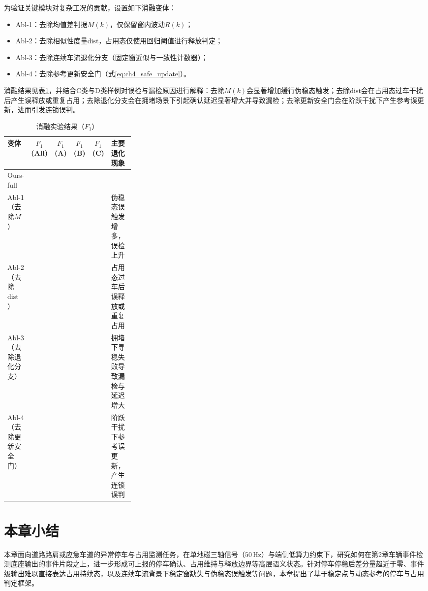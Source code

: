 \documentclass{xdupgthesis}
\begin{document}
为验证关键模块对复杂工况的贡献，设置如下消融变体：
\begin{itemize}
  \item Abl-1：去除均值差判据$M(k)$，仅保留窗内波动$R(k)$；
  \item Abl-2：去除相似性度量$\mathrm{dist}$，占用态仅使用回归阈值进行释放判定；
  \item Abl-3：去除连续车流退化分支（固定窗近似与一致性计数器）；
  \item Abl-4：去除参考更新安全门（式\eqref{eq:ch4_safe_update}）。
\end{itemize}
消融结果见表\ref{tab:ch4_ablation}，并结合C类与D类样例对误检与漏检原因进行解释：去除$M(k)$会显著增加缓行伪稳态触发；去除$\mathrm{dist}$会在占用态过车干扰后产生误释放或重复占用；去除退化分支会在拥堵场景下引起确认延迟显著增大并导致漏检；去除更新安全门会在阶跃干扰下产生参考误更新，进而引发连锁误判。

\begin{table}[t]
\centering
\caption{消融实验结果（$F_1$）}
\label{tab:ch4_ablation}
\begin{tabular}{l c c c c p{0.30\linewidth}}
\hline
变体 & $F_1$(All) & $F_1$(A) & $F_1$(B) & $F_1$(C) & 主要退化现象 \\
\hline
Ours-full &  &  &  &  &  \\
Abl-1（去除$M$） &  &  &  &  & 伪稳态误触发增多，误检上升 \\
Abl-2（去除$\mathrm{dist}$） &  &  &  &  & 占用态过车后误释放或重复占用 \\
Abl-3（去除退化分支） &  &  &  &  & 拥堵下寻稳失败导致漏检与延迟增大 \\
Abl-4（去除更新安全门） &  &  &  &  & 阶跃干扰下参考误更新，产生连锁误判 \\
\hline
\end{tabular}
\end{table}


\section{本章小结}
\label{sec:ch4_summary}

本章面向道路路肩或应急车道的异常停车与占用监测任务，在单地磁三轴信号（$50\,\mathrm{Hz}$）与端侧低算力约束下，研究如何在第2章车辆事件检测底座输出的事件片段之上，进一步形成可上报的停车确认、占用维持与释放边界等高层语义状态。针对停车停稳后差分量趋近于零、事件级输出难以直接表达占用持续态，以及连续车流背景下稳定窗缺失与伪稳态误触发等问题，本章提出了基于稳定点与动态参考的停车与占用判定框架。
\end{document}
